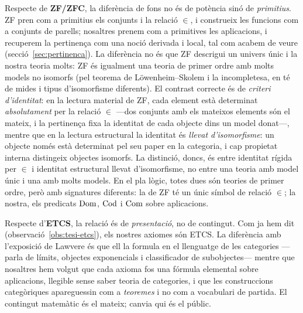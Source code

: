 Respecte de \textbf{ZF/ZFC}, la diferència de fons no és de potència sinó
de \emph{primitius}. ZF pren com a primitius els conjunts i la relació
\(\in\), i construeix les funcions com a conjunts de parells; nosaltres
prenem com a primitives les aplicacions, i recuperem la pertinença com una
noció derivada i local, tal com acabem de veure (secció~\ref{sec:pertinenca}).
La diferència no és que ZF descrigui un univers únic i la nostra teoria molts:
ZF és igualment una teoria de primer ordre amb molts models no isomorfs (pel
teorema de Löwenheim--Skolem i la incompletesa, en té de mides i tipus
d'isomorfisme diferents). El contrast correcte és de \emph{criteri d'identitat}:
en la lectura material de ZF, cada element està determinat \emph{absolutament}
per la relació \(\in\) ---dos conjunts amb els mateixos elements són el mateix,
i la pertinença fixa la identitat de cada objecte dins un model donat---,
mentre que en la lectura estructural la identitat és \emph{llevat
d'isomorfisme}: un objecte només està determinat pel seu paper en la categoria,
i cap propietat interna distingeix objectes isomorfs. La distinció, doncs, és
entre identitat rígida per \(\in\) i identitat estructural llevat
d'isomorfisme, no entre una teoria amb model únic i una amb molts models. En el
pla lògic, totes dues són teories de primer ordre, però amb signatures
diferents: la de ZF té un únic símbol de relació \(\in\); la nostra, els
predicats \(\operatorname{Dom}\), \(\operatorname{Cod}\) i \(\operatorname{Com}\) sobre aplicacions.

Respecte d'\textbf{ETCS}, la relació és de \emph{presentació}, no de
contingut. Com ja hem dit (observació~\ref{obs:tesi-etcs}), els nostres
axiomes són ETCS. La diferència amb l'exposició de Lawvere és que ell la
formula en el llenguatge de les categories ---parla de límits, objectes
exponencials i classificador de subobjectes--- mentre que nosaltres hem
volgut que cada axioma fos una fórmula elemental sobre aplicacions,
llegible sense saber teoria de categories, i que les construccions
categòriques apareguessin com a \emph{teoremes} i no com a vocabulari de
partida. El contingut matemàtic és el mateix; canvia qui és el públic.

